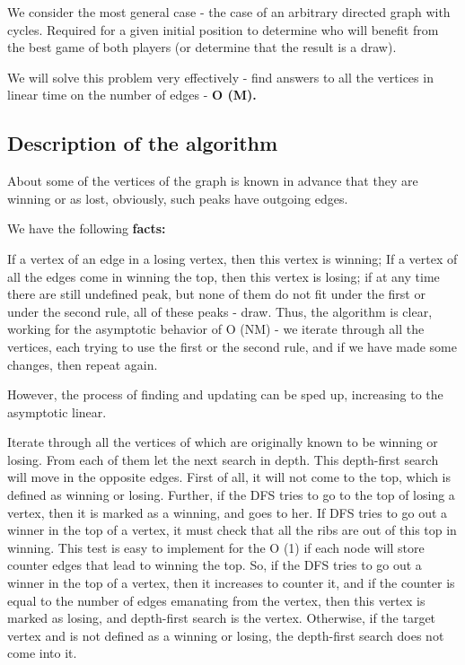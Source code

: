 We consider the most general case - the case of an arbitrary directed graph with cycles. Required for a given initial position to determine who will benefit from the best game of both players (or determine that the result is a draw).

We will solve this problem very effectively - find answers to all the vertices in linear time on the number of edges - \textbf{O (M).}

\subsection{ Description of the algorithm }
About some of the vertices of the graph is known in advance that they are winning or as lost, obviously, such peaks have outgoing edges.

We have the following \textbf{facts:}

If a vertex of an edge in a losing vertex, then this vertex is winning;
If a vertex of all the edges come in winning the top, then this vertex is losing;
if at any time there are still undefined peak, but none of them do not fit under the first or under the second rule, all of these peaks - draw.
Thus, the algorithm is clear, working for the asymptotic behavior of O (NM) - we iterate through all the vertices, each trying to use the first or the second rule, and if we have made some changes, then repeat again.

However, the process of finding and updating can be sped up, increasing to the asymptotic linear.

Iterate through all the vertices of which are originally known to be winning or losing. From each of them let the next search in depth. This depth-first search will move in the opposite edges. First of all, it will not come to the top, which is defined as winning or losing. Further, if the DFS tries to go to the top of losing a vertex, then it is marked as a winning, and goes to her. If DFS tries to go out a winner in the top of a vertex, it must check that all the ribs are out of this top in winning. This test is easy to implement for the O (1) if each node will store counter edges that lead to winning the top. So, if the DFS tries to go out a winner in the top of a vertex, then it increases to counter it, and if the counter is equal to the number of edges emanating from the vertex, then this vertex is marked as losing, and depth-first search is the vertex. Otherwise, if the target vertex and is not defined as a winning or losing, the depth-first search does not come into it.

